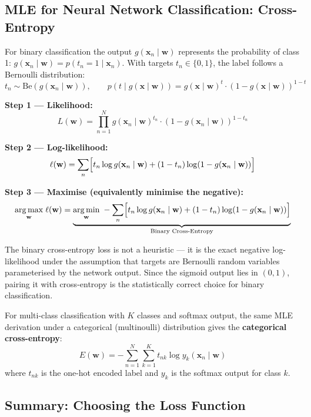 \documentclass[11pt,a4paper]{article}
\newcommand{\term}[1]{\textcolor{DefGreen}{\textbf{#1}}\index{#1}}
\begin{document}
\subsection{MLE for Neural Network Classification: Cross-Entropy}

For binary classification the output $g(\mathbf{x}_n \mid \mathbf{w})$ represents the probability of class 1: $g(\mathbf{x}_n \mid \mathbf{w}) = p(t_n = 1 \mid \mathbf{x}_n)$. With targets $t_n \in \{0,1\}$, the label follows a Bernoulli distribution:
\[
t_n \sim \mathrm{Be}(g(\mathbf{x}_n \mid \mathbf{w})), \qquad
p(t \mid g(\mathbf{x} \mid \mathbf{w})) = g(\mathbf{x} \mid \mathbf{w})^t \cdot (1 - g(\mathbf{x} \mid \mathbf{w}))^{1-t}
\]

\textbf{Step 1 — Likelihood:}
\[
L(\mathbf{w}) = \prod_{n=1}^N g(\mathbf{x}_n \mid \mathbf{w})^{t_n} \cdot (1 - g(\mathbf{x}_n \mid \mathbf{w}))^{1-t_n}
\]

\textbf{Step 2 — Log-likelihood:}
\[
\ell(\mathbf{w}) = \sum_n \Bigl[ t_n \log g(\mathbf{x}_n \mid \mathbf{w}) + (1-t_n)\log(1 - g(\mathbf{x}_n \mid \mathbf{w})) \Bigr]
\]

\textbf{Step 3 — Maximise (equivalently minimise the negative):}
\[
\underset{\mathbf{w}}{\arg\max}\;\ell(\mathbf{w})
= \underbrace{\underset{\mathbf{w}}{\arg\min}\;
-\sum_n \Bigl[ t_n \log g(\mathbf{x}_n \mid \mathbf{w}) + (1-t_n)\log(1-g(\mathbf{x}_n \mid \mathbf{w})) \Bigr]}_{\text{Binary Cross-Entropy}}
\]

\begin{insightbox}[Cross-entropy loss = MLE under Bernoulli assumption]
The binary cross-entropy loss is not a heuristic — it is the exact negative log-likelihood under the assumption that targets are Bernoulli random variables parameterised by the network output. Since the sigmoid output lies in $(0,1)$, pairing it with cross-entropy is the statistically correct choice for binary classification.
\end{insightbox}

For multi-class classification with $K$ classes and softmax output, the same MLE derivation under a categorical (multinoulli) distribution gives the \term{categorical cross-entropy}:
\[
E(\mathbf{w}) = -\sum_{n=1}^N \sum_{k=1}^K t_{nk} \log y_k(\mathbf{x}_n \mid \mathbf{w})
\]
where $t_{nk}$ is the one-hot encoded label and $y_k$ is the softmax output for class $k$.

\subsection{Summary: Choosing the Loss Function}
\end{document}
